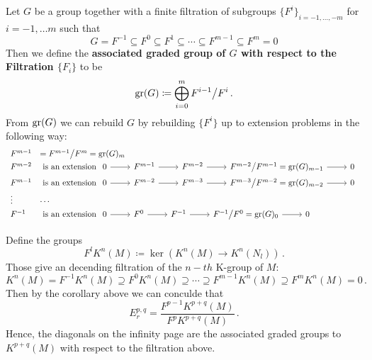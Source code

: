 \begin{definition}
	Let $G$ be a group together with a finite filtration of subgroups $\{F^i\}_{i=-1,\dots,-m}$ for $i=-1,\dots m$ such that 
	\begin{equation*}
		G=F^{-1}\subseteq F^0 \subseteq F^1\subseteq \cdots \subseteq F^{m-1}\subseteq F^m=0
	\end{equation*}
	Then we define the \textbf{associated graded group of $G$ with respect to the Filtration $\{F_i\}$} to be 
	\begin{equation*}
		\operatorname{\mathrm{gr}}(G)\coloneq \bigoplus_{i=0}^{m} F^{i-1}\big/ F^{i}\, .
	\end{equation*} 
	From $\operatorname{\mathrm{gr}}(G)$ we can rebuild $G$ by rebuilding $\{F^i\}$ up to extension problems in the following way:
	\begin{equation*}
		\begin{array}{ll}
			F^{m-1} & =F^{m-1}\big/F^m=\gr(G)_m \\
			F^{m-2} &  \text{ is an extension } 
			\begin{tikzcd}
				0 \arrow[r] & F^{m-1} \arrow[r] & F^{m-2} \arrow[r] & F^{m-2}\big/F^{m-1}=\gr(G)_{m-1} \arrow[r] & 0
				\end{tikzcd}\\
		F^{m-1}&  \text{ is an extension } 
		\begin{tikzcd}
			0 \arrow[r] & F^{m-2} \arrow[r] & F^{m-3} \arrow[r] & F^{m-3}\big/F^{m-2}=\gr(G)_{m-2} \arrow[r] & 0
		\end{tikzcd} \\
		\vdots & \cdots\\
		F^{-1}&  \text{ is an extension } 
		\begin{tikzcd}
			0 \arrow[r] & F^{0} \arrow[r] & F^{-1} \arrow[r] & F^{-1}\big/F^{0}=\gr(G)_{0} \arrow[r] & 0
		\end{tikzcd}
		\end{array}
	\end{equation*}
\end{definition}
\begin{corollary}
	Define the groups
	\begin{equation*}
		F^lK^n(M)\coloneq \ker\left(K^{n}(M)\to K^n(N_l)\right)\,.
	\end{equation*} Those give an decending filtration of the $n-th$ K-group of $M$:
	\begin{equation*}
		K^n(M)=F^{-1}K^n(M)\supseteq F^{0}K^n(M)\supseteq \cdots \supseteq F^{m-1}K^n(M)\supseteq F^{m}K^n(M)=0\,.
	\end{equation*}
	Then by the corollary above we can conculde that
	\begin{equation*}
		E^{p,q}_r=\frac{F^{p-1}K^{p+q}(M)}{F^pK^{p+q}(M)}\,.
	\end{equation*} Hence, the diagonals on the infinity page are the associated graded groups to $K^{p+q}(M)$ with respect to the filtration above.
\end{corollary}

